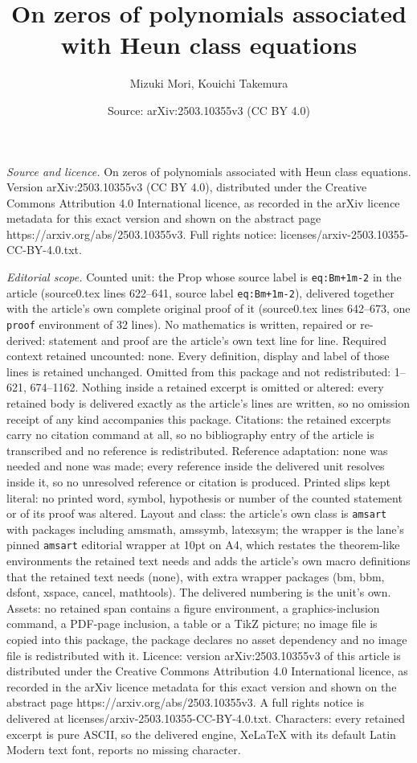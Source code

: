 \documentclass[10pt,a4paper]{amsart}
\title[On zeros of polynomials associated with Heun class equations]{On zeros of polynomials associated with Heun class equations}
\author{Mizuki Mori, Kouichi Takemura}
\date{Source: arXiv:2503.10355v3 (CC BY 4.0)}
\begin{document}
\maketitle

\noindent\emph{Source and licence.} On zeros of polynomials associated with Heun class equations. Version arXiv:2503.10355v3 (CC BY 4.0), distributed under the Creative Commons Attribution 4.0 International licence, as recorded in the arXiv licence metadata for this exact version and shown on the abstract page https://arxiv.org/abs/2503.10355v3. Full rights notice: licenses/arxiv-2503.10355-CC-BY-4.0.txt.\par\smallskip

\noindent\textit{Editorial scope.} Counted unit: the Prop whose source label is \texttt{eq:Bm+1m-2} in the article (source0.tex lines 622--641, source label \texttt{eq:Bm+1m-2}), delivered together with the article's own complete original proof of it (source0.tex lines 642--673, one \texttt{proof} environment of 32 lines). No mathematics is written, repaired or re-derived: statement and proof are the article's own text line for line. Required context retained uncounted: none. Every definition, display and label of those lines is retained unchanged. Omitted from this package and not redistributed: 1--621, 674--1162. Nothing inside a retained excerpt is omitted or altered: every retained body is delivered exactly as the article's lines are written, so no omission receipt of any kind accompanies this package. Citations: the retained excerpts carry no citation command at all, so no bibliography entry of the article is transcribed and no reference is redistributed. Reference adaptation: none was needed and none was made; every reference inside the delivered unit resolves inside it, so no unresolved reference or citation is produced. Printed slips kept literal: no printed word, symbol, hypothesis or number of the counted statement or of its proof was altered. Layout and class: the article's own class is \texttt{amsart} with packages including amsmath, amssymb, latexsym; the wrapper is the lane's pinned \texttt{amsart} editorial wrapper at 10pt on A4, which restates the theorem-like environments the retained text needs and adds the article's own macro definitions that the retained text needs (none), with extra wrapper packages (bm, bbm, dsfont, xspace, cancel, mathtools). The delivered numbering is the unit's own. Assets: no retained span contains a figure environment, a graphics-inclusion command, a PDF-page inclusion, a table or a TikZ picture; no image file is copied into this package, the package declares no asset dependency and no image file is redistributed with it. Licence: version arXiv:2503.10355v3 of this article is distributed under the Creative Commons Attribution 4.0 International licence, as recorded in the arXiv licence metadata for this exact version and shown on the abstract page https://arxiv.org/abs/2503.10355v3. A full rights notice is delivered at licenses/arxiv-2503.10355-CC-BY-4.0.txt. Characters: every retained excerpt is pure ASCII, so the delivered engine, XeLaTeX with its default Latin Modern text font, reports no missing character.
\end{document}
